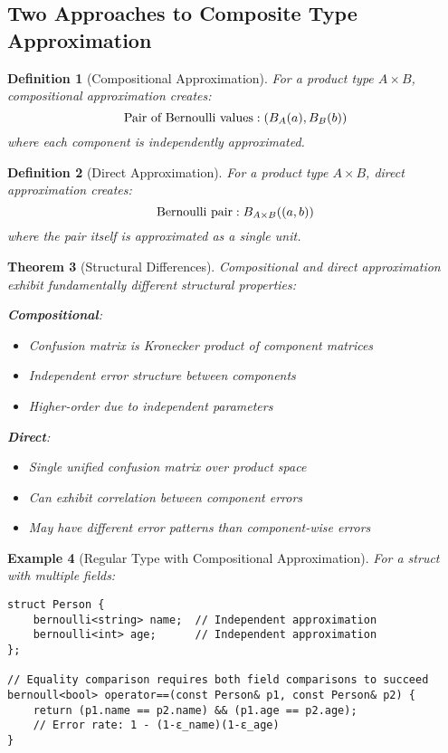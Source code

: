 \documentclass[11pt,final,hidelinks]{article}
\newtheorem{theorem}{Theorem}[section]
\newtheorem{definition}[theorem]{Definition}
\newtheorem{example}[theorem]{Example}
\begin{document}
\subsection{Two Approaches to Composite Type Approximation}

\begin{definition}[Compositional Approximation]
For a product type $A \times B$, \emph{compositional approximation} creates:
$$\text{Pair of Bernoulli values}: (B_{A}(a), B_{B}(b))$$
where each component is independently approximated.
\end{definition}

\begin{definition}[Direct Approximation]
For a product type $A \times B$, \emph{direct approximation} creates:
$$\text{Bernoulli pair}: B_{A \times B}((a,b))$$
where the pair itself is approximated as a single unit.
\end{definition}

\begin{theorem}[Structural Differences]
Compositional and direct approximation exhibit fundamentally different structural properties:

\textbf{Compositional}: 
\begin{itemize}
    \item Confusion matrix is Kronecker product of component matrices
    \item Independent error structure between components
    \item Higher-order due to independent parameters
\end{itemize}

\textbf{Direct}:
\begin{itemize}
    \item Single unified confusion matrix over product space
    \item Can exhibit correlation between component errors
    \item May have different error patterns than component-wise errors
\end{itemize}
\end{theorem}

\begin{example}[Regular Type with Compositional Approximation]
For a struct with multiple fields:
\begin{verbatim}
struct Person {
    bernoulli<string> name;  // Independent approximation
    bernoulli<int> age;      // Independent approximation
};

// Equality comparison requires both field comparisons to succeed
bernoull<bool> operator==(const Person& p1, const Person& p2) {
    return (p1.name == p2.name) && (p1.age == p2.age);
    // Error rate: 1 - (1-ε_name)(1-ε_age)
}
\end{verbatim}
\end{example}
\end{document}
